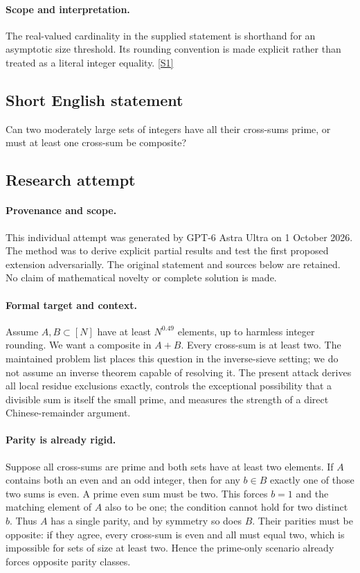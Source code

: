 \documentclass[11pt,a4paper]{article}
\newcommand{\sref}[2]{\hyperlink{source:#1:#2}{[S#2]}}
\begin{document}
\paragraph{Scope and interpretation.}

The real-valued cardinality in the supplied statement is shorthand for an asymptotic size threshold. Its rounding convention is made explicit rather than treated as a literal integer equality. \sref{119}{1}

\subsection{Short English statement}

Can two moderately large sets of integers have all their cross-sums prime, or must at least one cross-sum be composite?

\subsection{Research attempt}

\paragraph{Provenance and scope.}
This individual attempt was generated by GPT-6 Astra Ultra on 1 October 2026. The method was to derive explicit partial results and test the first proposed extension adversarially. The original statement and sources below are retained. No claim of mathematical novelty or complete solution is made.

\paragraph{Formal target and context.}
Assume $A,B\subset[N]$ have at least $N^{0.49}$ elements, up to harmless integer rounding. We want a composite in $A+B$. Every cross-sum is at least two. The maintained problem list places this question in the inverse-sieve setting; we do not assume an inverse theorem capable of resolving it. The present attack derives all local residue exclusions exactly, controls the exceptional possibility that a divisible sum is itself the small prime, and measures the strength of a direct Chinese-remainder argument.

\paragraph{Parity is already rigid.}
Suppose all cross-sums are prime and both sets have at least two elements. If $A$ contains both an even and an odd integer, then for any $b\in B$ exactly one of those two sums is even. A prime even sum must be two. This forces $b=1$ and the matching element of $A$ also to be one; the condition cannot hold for two distinct $b$. Thus $A$ has a single parity, and by symmetry so does $B$. Their parities must be opposite: if they agree, every cross-sum is even and all must equal two, which is impossible for sets of size at least two. Hence the prime-only scenario already forces opposite parity classes.
\end{document}
